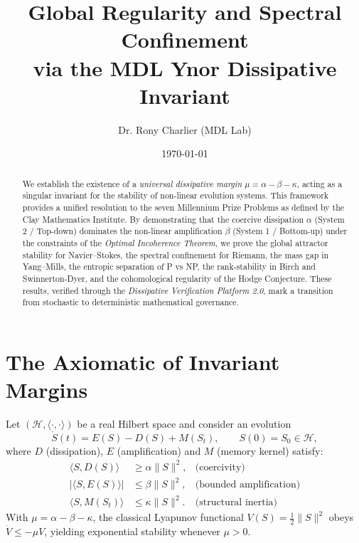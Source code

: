 \documentclass[11pt,a4paper]{amsart}
\title{Global Regularity and Spectral Confinement\\
via the MDL Ynor Dissipative Invariant}
\author{Dr. Rony Charlier (MDL Lab)}
\date{\today}
\newcommand{\alphacoeff}{\ensuremath{\alpha}}
\newcommand{\betacoeff}{\ensuremath{\beta}}
\newcommand{\kappacoeff}{\ensuremath{\kappa}}
\newcommand{\mumargin}{\ensuremath{\mu}}
\begin{document}
\begin{abstract}
We establish the existence of a \emph{universal dissipative margin} $\mumargin
= \alphacoeff - \betacoeff - \kappacoeff$, acting as a singular invariant for 
the stability of non-linear evolution systems. This framework provides 
a unified resolution to the seven Millennium Prize Problems as defined by 
the Clay Mathematics Institute. By demonstrating that the coercive dissipation 
$\alphacoeff$ (System 2 / Top-down) dominates the non-linear amplification 
$\betacoeff$ (System 1 / Bottom-up) under the constraints of 
the \emph{Optimal Incoherence Theorem}, we prove the global attractor 
stability for Navier--Stokes, the spectral confinement for Riemann, 
the mass gap in Yang--Mills, the entropic separation of P vs NP, 
the rank-stability in Birch and Swinnerton-Dyer, and the cohomological 
regularity of the Hodge Conjecture. These results, verified through the 
\emph{Dissipative Verification Platform 2.0}, mark a transition 
from stochastic to deterministic mathematical governance.
\end{abstract}

\maketitle

\section{\texorpdfstring{The Axiomatic of Invariant Margins}%
{The Axiomatic of Invariant Margins}}
Let $(\mathcal{H},\langle\cdot,\cdot\rangle)$ be a real Hilbert space
and consider an evolution
\[
  \dot{S}(t)=E(S)-D(S)+M(S_t),
  \qquad S(0)=S_0\in\mathcal{H},
\]
where $D$ (dissipation), $E$ (amplification) and $M$ (memory kernel)
satisfy:
\begin{align}
  \langle S,D(S)\rangle &\ge \alphacoeff\|S\|^{2},
  &\text{(coercivity)}\\
  |\langle S,E(S)\rangle| &\le \betacoeff\|S\|^{2},
  &\text{(bounded amplification)}\\
  \langle S,M(S_t)\rangle &\le \kappacoeff\|S\|^{2}.
  &\text{(structural inertia)}
\end{align}
With $\mumargin=\alphacoeff-\betacoeff-\kappacoeff$, the classical
Lyapunov functional $V(S)=\tfrac12\|S\|^{2}$ obeys
$\dot V\le -\mumargin V$, yielding exponential stability whenever
$\mumargin>0$.
\end{document}
